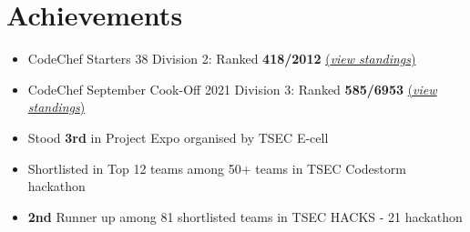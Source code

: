 \documentclass[a4,10pt]{article}
\newenvironment{zitemize}{
\begin{itemize}\itemsep0pt \parskip0pt \parsep1pt}
{\end{itemize}\vspace{-0.5cm}}
\begin{document}
\section{Achievements}
\begin{zitemize}
    
        \item  CodeChef Starters 38 Division 2: Ranked \textbf{418/2012} \href{https://www.codechef.com/rankings/START38B?itemsPerPage=100&order=asc&page=21&search=shyren_more&sortBy=rank}{(\textit{view standings})}
            
        \item CodeChef September Cook-Off 2021 Division 3: Ranked \textbf{585/6953} \href{https://www.codechef.com/rankings/COOK133C?order=asc&search=shyren_more&sortBy=rank}{(\textit{view standings})}
            
        \item Stood \textbf{3rd} in Project Expo organised by TSEC E-cell 
                
        \item Shortlisted in Top 12 teams among  50+ teams in TSEC Codestorm hackathon 
                
        \item \textbf{2nd} Runner up among 81 shortlisted teams in TSEC HACKS - 21 hackathon 
                
            
        \vspace{0.5cm}    
    \end{zitemize}

\end{document}
